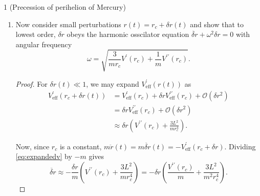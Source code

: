 \documentclass[11pt]{article}
\begin{document}
\begin{problem}{1 (Precession of perihelion of Mercury)}
\begin{enumerate}[label=(\alph*)]
\begin{proof}
			      Now, the orbital period \( T \) is
			      \begin{equation}
				      \label{eq:16}
				      T = \frac{\text{change in radians}}{\text{radial speed}} = \frac{2\pi}{\dot{\phi}} = \frac{2\pi}{L/ m r_{c}^2} = \frac{2\pi m r_{c}^2}{L},
			      \end{equation}
			      where we solved the equation for \( L \) in terms of \( \dot{\phi} \) to obtain an expression for \( \dot{\phi} \) in terms of \( L \) and \( r \).
		      \end{proof}
		\item Now consider small perturbations \( r(t) = r_c + \delta r(t) \) and show that to lowest order, \(\delta r\) obeys the harmonic osscilator equation \( \ddot{\delta r} + \omega^2 \delta r = 0 \) with angular frequency
		      \begin{equation}
			      \label{eq:5}
			      \omega = \sqrt{\frac{3}{m r_{c}} V^{\prime}(r_c) + \frac{1}{m} V^{\prime\prime}(r_c)}.
		      \end{equation}
		      \begin{proof}
			      For \( \delta r(t) \ll 1 \), we may expand \( V^{\prime}_{\text{eff}}(r(t)) \) as
            \begin{equation}
			      \begin{aligned}
				      V^{\prime}_{\text{eff}}(r_c + \delta r(t)) & = V_{\text{eff}}^{\prime}(r_c) + \delta r V^{\prime\prime}_{\text{eff}}(r_{c}) + \mathcal{O}(\delta r^2) \\
				                                                 & = \delta r V_{\text{eff}}^{\prime\prime}(r_c) + \mathcal{O}(\delta r^2)                                  \\
				      \label{eq:expandedv}                       & \approx \delta r \left( V^{\prime\prime}(r_c) + \frac{3L^2}{mr_{c}^{4}} \right).
			      \end{aligned}
            \end{equation}

			      Now, since \( r_c \) is a constant, \( m \ddot{r}(t) = m\ddot{\delta r}(t) = -V^{\prime}_{\text{eff}}(r_c + \delta r)\).
			      Dividing \cref{eq:expandedv} by \( -m \) gives
			      \begin{equation}
				      \label{eq:27}
				      \ddot{\delta r} \approx -\frac{\delta r}{m} \left( V^{\prime\prime}(r_c)  + \frac{3L^2}{m r_c^4}\right) = -\delta r \left( \frac{V^{\prime\prime}(r_c)}{m} + \frac{3L^2}{m^2 r_{c}^{4}} \right).
			      \end{equation}


\end{proof}
\end{enumerate}
\end{problem}
\end{document}
